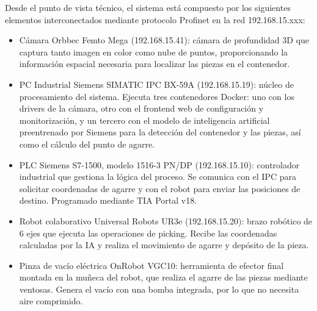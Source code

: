 \clearpage
{}

Desde el punto de vista técnico, el sistema está compuesto por los siguientes elementos interconectados mediante
protocolo Profinet en la red 192.168.15.xxx:
\begin{itemize}
	\item Cámara Orbbec Femto Mega (192.168.15.41): cámara de profundidad 3D que captura tanto imagen en
	      color como nube de puntos, proporcionando la información espacial necesaria para localizar
	      las piezas en el contenedor.
	\item PC Industrial Siemens SIMATIC IPC BX-59A (192.168.15.19): núcleo de procesamiento del sistema.
	      Ejecuta tres contenedores Docker: uno con los drivers de la cámara, otro con el frontend
	      web de configuración y monitorización, y un tercero con el modelo de inteligencia artificial
	      preentrenado por Siemens para la detección del contenedor y las piezas, así como el cálculo
	      del punto de agarre.
	\item PLC Siemens S7-1500, modelo 1516-3 PN/DP (192.168.15.10): controlador industrial que gestiona
	      la lógica del proceso. Se comunica con el IPC para solicitar coordenadas de agarre y con
	      el robot para enviar las posiciones de destino. Programado mediante TIA Portal v18.
	\item Robot colaborativo Universal Robots UR3e (192.168.15.20): brazo robótico de 6 ejes que
	      ejecuta las operaciones de picking. Recibe las coordenadas calculadas por la IA y
	      realiza el movimiento de agarre y depósito de la pieza.
	\item Pinza de vacío eléctrica OnRobot VGC10: herramienta de efector final montada en la muñeca del robot,
	      que realiza el agarre de las piezas mediante ventosas. Genera el vacío con una bomba integrada, por lo que no necesita aire comprimido.
\end{itemize}

